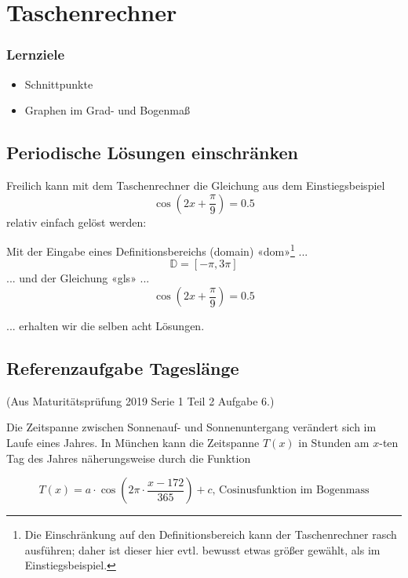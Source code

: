 
\section{Taschenrechner}

\subsubsection*{Lernziele}

\begin{itemize}
\item Schnittpunkte
\item Graphen im Grad- und Bogenmaß
\end{itemize}

\subsection{Periodische Lösungen einschränken}
Freilich kann mit dem Taschenrechner die Gleichung aus dem
Einstiegsbeispiel $$\cos\left(2x+\frac{\pi}{9}\right)=0.5$$ relativ einfach gelöst werden:

Mit der Eingabe eines Definitionsbereichs (domain) «dom»\footnote{Die Einschränkung auf den Definitionsbereich kann der Taschenrechner rasch ausführen; daher ist dieser hier evtl. bewusst etwas größer gewählt, als im Einstiegsbeispiel.}  ...
$$\mathbb{D} =  [ -\pi , 3\pi]$$
... und der Gleichung «gls» ...
$$\cos\left(2x+\frac{\pi}{9}\right) = 0.5$$

... erhalten wir die selben acht Lösungen.
    

\newpage

\subsection{Referenzaufgabe Tageslänge}
(Aus Maturitätsprüfung 2019 Serie 1 Teil 2 Aufgabe 6.)

Die Zeitspanne zwischen Sonnenauf- und Sonnenuntergang verändert sich im Laufe eines Jahres.
In München kann die Zeitspanne $T(x)$ in Stunden am $x$-ten Tag des Jahres näherungsweise durch die Funktion

$$T(x) = a\cdot{}\cos\left( 2\pi\cdot{}\frac{x-172}{365}\right) + c\textrm{, Cosinusfunktion im Bogenmass}$$

